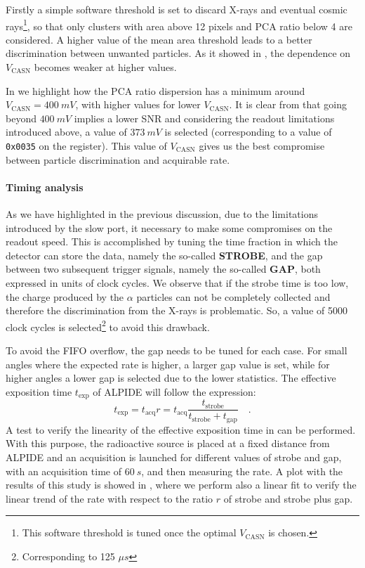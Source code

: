 \documentclass[../../main/main.tex]{subfiles}
\begin{document}
Firstly a simple software threshold is set to discard X-rays and eventual cosmic rays\footnote{This software threshold is tuned once the optimal $V_{\mathrm{CASN}}$ is chosen.}, so that only clusters with area above 12 pixels and PCA ratio below 4 are considered. A higher value of the mean area threshold leads to a better discrimination between unwanted particles. As it showed in , the dependence on $V_{\mathrm{CASN}}$ becomes weaker at higher values.

In  we highlight how the PCA ratio dispersion has a minimum around $V_{\mathrm{CASN}} = 400 \ \si{mV}$, with higher values for lower $V_{\mathrm{CASN}}$. It is clear from  that going beyond \( 400 \ \si{mV} \) implies a lower SNR and considering the readout limitations introduced above, a value of \( 373 \ \si{mV} \) is selected (corresponding to a value of \texttt{0x0035} on the register). This value of $V_{\mathrm{CASN}}$ gives us the best compromise between particle discrimination and acquirable rate.


\paragraph{Timing analysis}
As we have highlighted in the previous discussion, due to the limitations introduced by the slow port, it necessary to make some compromises on the readout speed. This is accomplished by tuning the time fraction in which the detector can store the data, namely the so-called \textbf{STROBE}, and the gap between two subsequent trigger signals, namely the so-called \textbf{GAP}, both expressed in units of clock cycles.
We observe that if the strobe time is too low, the charge produced by the $\alpha$ particles can not be completely collected and therefore the discrimination from the X-rays is problematic. So, a value of 5000 clock cycles is selected\footnote{{Corresponding to 125 $\mu s$}} to avoid this drawback.

To avoid the FIFO overflow, the gap needs to be tuned for each case. For small angles where the expected rate is higher, a larger gap value is set, while for higher angles a lower gap is selected due to the lower statistics.
The effective exposition time \( t_{\mathrm{exp}} \) of ALPIDE will follow the expression:
\begin{equation}
    t_{\mathrm{exp}}
    =
    t_{\mathrm{acq}} r
    =
    t_{\mathrm{acq}} \frac{t_{\mathrm{strobe}}}{t_{\mathrm{strobe}} + t_{\mathrm{gap}}}
    \quad .
    \label{eq:alpide_strobe_gap}
\end{equation}
A test to verify the linearity of the effective exposition time in  can be performed.
With this purpose, the radioactive source is placed at a fixed distance from ALPIDE and an acquisition is launched for different values of strobe and gap, with an acquisition time of \( 60 \ \si{s} \), and then measuring the rate. A plot with the results of this study is showed in , where we perform also a linear fit to verify the linear trend of the rate with respect to the ratio \( r \) of strobe and strobe plus gap.
\end{document}

